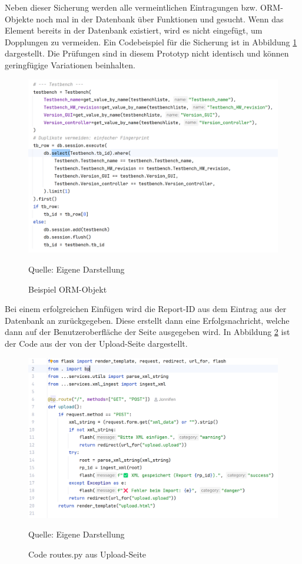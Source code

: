 Neben dieser Sicherung werden alle vermeintlichen Eintragungen bzw. \ac{ORM}-Objekte noch mal in der Datenbank über
Funktionen  und  gesucht.
Wenn das Element bereits in der Datenbank existiert, wird es nicht eingefügt, um Dopplungen zu vermeiden. Ein Codebeispiel für
die Sicherung ist in Abbildung \ref{fig: Beispiel ORM-Objekt} dargestellt.
Die Prüfungen sind in diesem Prototyp nicht identisch und können geringfügige Variationen beinhalten.

\begin{figure}[H]
    \centering
    \includegraphics[width=1\textwidth]{Grafiken/Beispiel ORM Obj}
    \caption{Beispiel ORM-Objekt}
    \label{fig: Beispiel ORM-Objekt}
    {Quelle: Eigene Darstellung}
\end{figure}

Bei einem erfolgreichen Einfügen wird die Report-ID aus dem Eintrag aus der Datenbank an  zurückgegeben.
Diese erstellt dann eine Erfolgsnachricht, welche dann auf der Benutzeroberfläche der Seite ausgegeben wird.
In Abbildung \ref{fig: Code routes.py aus Upload-Seite} ist der Code aus der  von der Upload-Seite dargestellt.

\begin{figure}[H]
    \centering
    \includegraphics[width=1\textwidth]{Grafiken/Code route Up}
    \caption{Code routes.py aus Upload-Seite}
    \label{fig: Code routes.py aus Upload-Seite}
    {Quelle: Eigene Darstellung}
\end{figure}







